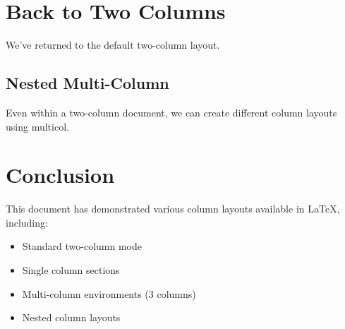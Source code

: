 \documentclass[10pt,twocolumn]{article}
\begin{document}
\twocolumn
\section{Back to Two Columns}
We've returned to the default two-column layout. \lipsum[7]

\begin{multicols}{2}
\subsection{Nested Multi-Column}
Even within a two-column document, we can create different column layouts using multicol.

\lipsum[8]
\end{multicols}

\section{Conclusion}
This document has demonstrated various column layouts available in LaTeX, including:
\begin{itemize}
    \item Standard two-column mode
    \item Single column sections
    \item Multi-column environments (3 columns)
    \item Nested column layouts
\end{itemize}
\end{document}
